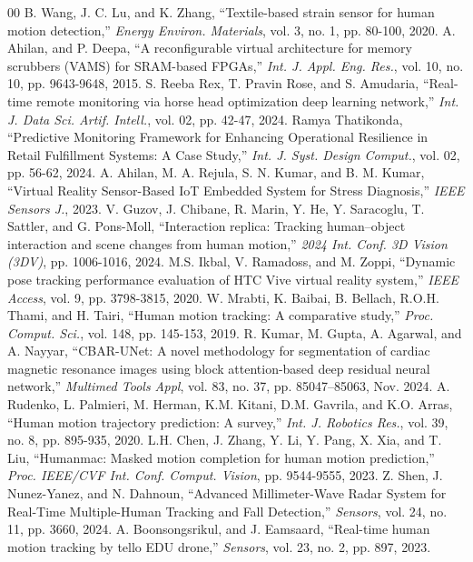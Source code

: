 \documentclass[conference]{IEEEtran}
\begin{document}
\begin{thebibliography}{00}
 B. Wang, J. C. Lu, and K. Zhang, ``Textile-based strain sensor for human motion detection,'' \textit{Energy Environ. Materials}, vol. 3, no. 1, pp. 80-100, 2020.
 A. Ahilan, and P. Deepa, ``A reconfigurable virtual architecture for memory scrubbers (VAMS) for SRAM-based FPGAs,'' \textit{Int. J. Appl. Eng. Res.}, vol. 10, no. 10, pp. 9643-9648, 2015.
 S. Reeba Rex, T. Pravin Rose, and S. Amudaria, ``Real-time remote monitoring via horse head optimization deep learning network,'' \textit{Int. J. Data Sci. Artif. Intell.}, vol. 02, pp. 42-47, 2024.
 Ramya Thatikonda, ``Predictive Monitoring Framework for Enhancing Operational Resilience in Retail Fulfillment Systems: A Case Study,'' \textit{Int. J. Syst. Design Comput.}, vol. 02, pp. 56-62, 2024.
 A. Ahilan, M. A. Rejula, S. N. Kumar, and B. M. Kumar, ``Virtual Reality Sensor-Based IoT Embedded System for Stress Diagnosis,'' \textit{IEEE Sensors J.}, 2023.
 V. Guzov, J. Chibane, R. Marin, Y. He, Y. Saracoglu, T. Sattler, and G. Pons-Moll, ``Interaction replica: Tracking human--object interaction and scene changes from human motion,'' \textit{2024 Int. Conf. 3D Vision (3DV)}, pp. 1006-1016, 2024.
 M.S. Ikbal, V. Ramadoss, and M. Zoppi, ``Dynamic pose tracking performance evaluation of HTC Vive virtual reality system,'' \textit{IEEE Access}, vol. 9, pp. 3798-3815, 2020.
 W. Mrabti, K. Baibai, B. Bellach, R.O.H. Thami, and H. Tairi, ``Human motion tracking: A comparative study,'' \textit{Proc. Comput. Sci.}, vol. 148, pp. 145-153, 2019.
 R. Kumar, M. Gupta, A. Agarwal, and A. Nayyar, ``CBAR-UNet: A novel methodology for segmentation of cardiac magnetic resonance images using block attention-based deep residual neural network,'' \textit{Multimed Tools Appl}, vol. 83, no. 37, pp. 85047--85063, Nov. 2024.
 A. Rudenko, L. Palmieri, M. Herman, K.M. Kitani, D.M. Gavrila, and K.O. Arras, ``Human motion trajectory prediction: A survey,'' \textit{Int. J. Robotics Res.}, vol. 39, no. 8, pp. 895-935, 2020.
 L.H. Chen, J. Zhang, Y. Li, Y. Pang, X. Xia, and T. Liu, ``Humanmac: Masked motion completion for human motion prediction,'' \textit{Proc. IEEE/CVF Int. Conf. Comput. Vision}, pp. 9544-9555, 2023.
 Z. Shen, J. Nunez-Yanez, and N. Dahnoun, ``Advanced Millimeter-Wave Radar System for Real-Time Multiple-Human Tracking and Fall Detection,'' \textit{Sensors}, vol. 24, no. 11, pp. 3660, 2024.
 A. Boonsongsrikul, and J. Eamsaard, ``Real-time human motion tracking by tello EDU drone,'' \textit{Sensors}, vol. 23, no. 2, pp. 897, 2023.

\end{thebibliography}
\end{document}
